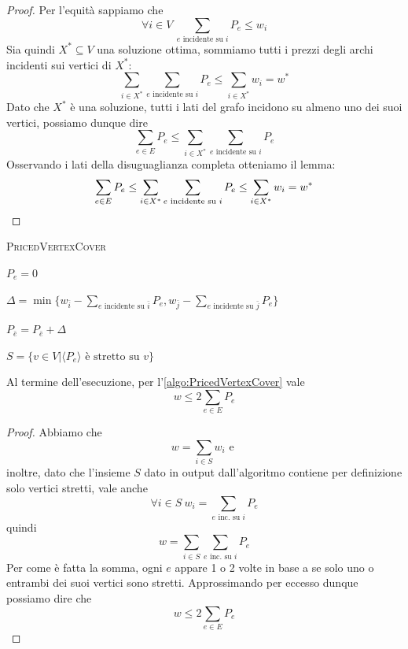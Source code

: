 \begin{proof}
	Per l'equità sappiamo che
	$$
		\forall i \in V ~ \sum_{e \text{ incidente su } i} P_e \leq w_i
	$$
	Sia quindi $X^*\subseteq V$ una soluzione ottima, sommiamo tutti i prezzi 
	degli archi incidenti sui vertici di $X^*$:
	$$
		\sum_{i \in X^*} \sum_{e \text{ incidente su } i} P_e \leq \sum_{i \in X^*} w_i = w^*
	$$
	Dato che $X^*$ è una soluzione, tutti i lati del grafo incidono su almeno
	uno dei suoi vertici, possiamo dunque dire
	$$
		\sum_{e \in E} P_e \leq \sum_{i \in X^*} \sum_{e \text{ incidente su } i} P_e
	$$
	Osservando i lati della disuguaglianza completa otteniamo il lemma:
	$$
		\sum_{e \in E} P_e \leq \sum_{i \in X^*} \sum_{e \text{ incidente su } i} P_e \leq \sum_{i \in X^*} w_i = w^* \\
	$$
\end{proof}
\begin{algorithm}
	\caption{\textsc{PricedVertexCover}}
	\label{algo:PricedVertexCover}

	{
		$P_e = 0$
	}

	{
		$\Delta = \min\{w_{\bar{i}} - \sum_{e \text{ incidente su } \bar{i}} P_e, w_{\bar{j}} - \sum_{e \text{ incidente su } \bar{j}} P_e\}$

		$P_{\bar{e}} = P_{\bar{e}} + \Delta$
	}

	$S = \{v \in V | \langle P_e \rangle \text{ è stretto su } v\}$

\end{algorithm}

\begin{lemma}\label{lem:pvcov_w_le_w_sum_P_e}
	Al termine dell'esecuzione, per l'\cref{algo:PricedVertexCover} vale
	$$
		w \leq 2 \sum_{e \in E} P_e
	$$
\end{lemma}
\begin{proof}
	Abbiamo che
	$$
		w = \sum_{i \in S} w_i \text { e } 
	$$
	inoltre, dato che l'insieme $S$ dato in output dall'algoritmo contiene per definizione
	solo vertici stretti, vale anche
	$$
		\forall i \in S ~ w_i = \sum_{e \text{ inc. su } i} P_e
	$$
	quindi
	$$
		w = \sum_{i \in S} \sum_{e \text{ inc. su } i} P_e
	$$
	Per come è fatta la somma, ogni $e$ appare 1 o 2 volte in base a se solo uno o entrambi
	dei suoi vertici sono stretti. Approssimando per eccesso dunque possiamo dire che
	$$
		w \leq 2 \sum_{e \in E} P_e
	$$
\end{proof}

